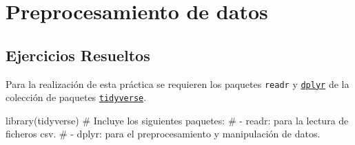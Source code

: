 \documentclass[
  a4paper,
]{scrreport}
\newenvironment{Shaded}{\begin{snugshade}}{\end{snugshade}}
\newcommand{\CommentTok}[1]{\textcolor[rgb]{0.37,0.37,0.37}{#1}}
\newcommand{\FunctionTok}[1]{\textcolor[rgb]{0.28,0.35,0.67}{#1}}
\newcommand{\NormalTok}[1]{\textcolor[rgb]{0.00,0.23,0.31}{#1}}
\theoremstyle{definition}
\theoremstyle{remark}
\begin{document}

\hypertarget{preprocesamiento-de-datos}{%
\chapter{Preprocesamiento de datos}\label{preprocesamiento-de-datos}}

\hypertarget{ejercicios-resueltos}{%
\section{Ejercicios Resueltos}\label{ejercicios-resueltos}}

Para la realización de esta práctica se requieren los paquetes
\texttt{readr} y
\href{https://aprendeconalf.es/manual-r/06-preprocesamiento.html\#el-paquete-dplyr}{\texttt{dplyr}}
de la colección de paquetes
\href{https://aprendeconalf.es/manual-r/06-preprocesamiento.html\#la-colecci\%C3\%B3n-de-paquetes-tidyverse}{\texttt{tidyverse}}.

\begin{Shaded}
\begin{Highlighting}[]
\FunctionTok{library}\NormalTok{(tidyverse) }
\CommentTok{\# Incluye los siguientes paquetes:}
\CommentTok{\# {-} readr: para la lectura de ficheros csv. }
\CommentTok{\# {-} dplyr: para el preprocesamiento y manipulación de datos.}
\end{Highlighting}
\end{Shaded}
\end{document}
